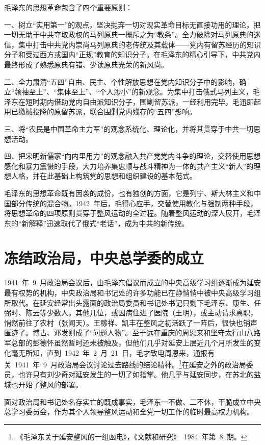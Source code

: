 毛泽东的思想革命包含了四个重要原则：

一、树立“实用第一”的观点，坚决抛弃一切对现实革命目标无直接功用的理论，把一切无助于中共夺取政权的马列原典一概斥之为“教条”。全力破除对马列原典的迷信，集中打击中共党内崇尚马列原典的老传统及其载体——党内有留苏经历的知识分子和受过西方或国内“正规”教育的知识分子。在毛泽东的精心引导下，中共党内最终形成了熟悉原典有错、少读原典光荣的新风尚。

二、全力肃清“五四”自由、民主、个性解放思想在党内知识分子中的影响，确立“领袖至上”、“集体至上”、“个人渺小”的新观念。为集中打击俄式马列主义，毛泽东在短时期内借助党内自由派知识分子，围剿留苏派，一经利用完毕，毛迅即起用已缴械投降的原留苏派，联合围剿党内残存的“五四”影响。

三、将“农民是中国革命主力军”的观念系统化、理论化，并将其贯穿于中共一切思想活动。

四、把宋明新儒家“向内里用力”的观念融入共产党党内斗争的理论，交替使用思想感化和暴力震慑的手段，大力培养集忠顺与战斗精神为一体的共产主义“新人”的理想人格，并在此基础上构筑党的思想和组织建设的基本范式。

毛泽东的思想革命既有因袭的成份，也有独创的方面，它是列宁、斯大林主义和中国部分传统的混合物。1942~年后，毛得心应手，交替使用教化与强制两种手段，将思想革命的四项原则贯穿于整风运动的全过程。随着整风运动的深人展开，毛泽东的“新解释”迅速取代了俄式“老话”，成为中共的新传统。

\section{冻结政治局，中央总学委的成立}

1941~年~9~月政治局会议后，由毛泽东倡议而成立的中央高级学习组逐渐成为延安最有权势的机构，中央政治局和书记处的许多功能已在静悄悄中被中央高级学习组所取代。在延安经常出头露面的政治局委员和书记处书记只剩下毛泽东、康生、任弼时、陈云等少数人。其他几位，或因病住进了医院（王明），或主动请求离职，悄然前往了农村（张闻天）。王稼祥、凯丰在整风之初活跃了一阵后，很快也销声匿迹了。博古、邓发则成了“问题人物”。至于远在重庆的周恩来和坚守太行山八路军总部的彭德怀虽然暂时还未被触及，但他们几乎对延安上层近几个月所发生的变化毫无所知，直到~1942~年~2~月~21~日，毛才致电周恩来，通报有关~1941~年~9~月政治局会议讨论过去路线的结论精神。\footnote{《毛泽东关于延安整风的一组函电》，《文献和研究》~1984~年第~8~期。}在延安之外的政治局委员，也许只有刘少奇对延安发生的一切了如指掌。他几乎与延安同步，在苏北的盐城也开始了整风的部署。

面对政治局和书记处名存实亡的既成事实，毛泽东一不做、二不休，干脆成立中央总学习委员会，作为其个人领导整风运动和全党一切工作的临时最高权力机构。

